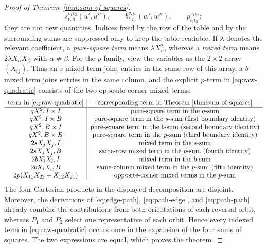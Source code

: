 \documentclass[pdflatex,sn-mathphys-num]{sn-jnl}
\theoremstyle{thmstyleone}
\begin{document}
\begin{proof}[Proof of Theorem~\ref{thm:sum-of-squares}]
\[s_{t,u}^{v_1v_2}(u',u''),\qquad
b_{t_1t_2}^{v,w}(w',w''),\qquad
p_{t_1t_2}^{v_1v_2};
\]
they are not new quantities.  Indices fixed by the row of the table and by
the surrounding sums are suppressed only to keep the table readable.  If
$\lambda$ denotes the relevant coefficient, a \emph{pure-square term} means
$\lambda X_\alpha^2$, whereas a \emph{mixed term} means
$2\lambda X_\alpha X_\beta$ with $\alpha\ne\beta$.  For the
$p$-family, view the variables as the $2\times2$ array $(X_{ij})$.  Thus an
$s$-mixed term joins entries in the same row of this array, a $b$-mixed term
joins entries in the same column, and the explicit $p$-term in
\eqref{eq:raw-quadratic} consists of the two opposite-corner mixed terms:
\[
\begin{array}{c|c}
\text{term in \eqref{eq:raw-quadratic}}&
\text{corresponding term in Theorem~\ref{thm:sum-of-squares}}\\ \hline
qX^2, I\times I&\text{pure-square term in the }q\text{-sum}\\
qX^2, I\times B&\text{pure-square term in the }s\text{-sum (first boundary identity)}\\
qX^2, B\times I&\text{pure-square term in the }b\text{-sum (second boundary identity)}\\
qX^2, B\times B&\text{pure-square term in the }p\text{-sum (third boundary identity)}\\
2sX_jX_{\bar j}, I&\text{mixed term in the }s\text{-sum}\\
2sX_jX_{\bar j}, B&\text{same-row mixed term in the }p\text{-sum (fourth identity)}\\
2bX_iX_{\bar i}, I&\text{mixed term in the }b\text{-sum}\\
2bX_iX_{\bar i}, B&\text{same-column mixed term in the }p\text{-sum (fifth identity)}\\
2p(X_{11}X_{22}+X_{12}X_{21})&
\text{opposite-corner mixed terms in the }p\text{-sum}
\end{array}
\]
The four Cartesian products in the displayed decomposition are disjoint.
Moreover,
the derivations of \eqref{eq:edge-path}, \eqref{eq:path-edge}, and
\eqref{eq:path-path} already combine the contributions from both orientations
of each reversal orbit, whereas $P_1$ and $P_2$ select one representative of
each orbit.  Hence every indexed term in \eqref{eq:raw-quadratic} occurs once
in the expansion of the four sums of squares.  The two expressions are equal,
which proves the theorem.
\end{proof}
\end{document}
